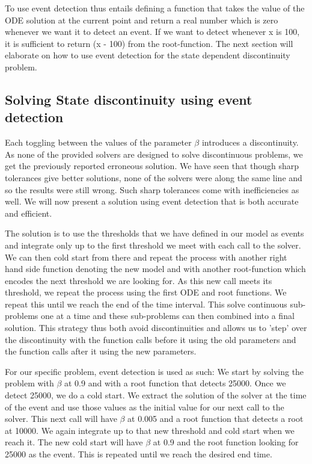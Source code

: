 To use event detection thus entails defining a function that takes the value of the ODE solution at the current point and return a real number which is zero whenever we want it to detect an event. If we want to detect whenever x is 100, it is sufficient to return (x - 100) from the root-function. The next section will elaborate on how to use event detection for the state dependent discontinuity problem.

\subsection{Solving State discontinuity using event detection}
\label{subsection:state_with_event_detection}
Each toggling between the values of the parameter $\beta$ introduces a discontinuity. As none of the provided solvers are designed to solve discontinuous problems, we get the previously reported erroneous solution. We have seen that though sharp tolerances give better solutions, none of the solvers were along the same line and so the results were still wrong. Such sharp tolerances come with inefficiencies as well. We will now present a solution using event detection that is both accurate and efficient.

The solution is to use the thresholds that we have defined in our model as events and integrate only up to the first threshold we meet with each call to the solver. We can then cold start from there and repeat the process with another right hand side function denoting the new model and with another root-function which encodes the next threshold we are looking for.  As this new call meets its threshold, we repeat the process using the first ODE and root functions. We repeat this until we reach the end of the time interval. This solve continuous sub-problems one at a time and these sub-problems can then combined into a final solution. This strategy thus both avoid discontinuities and allows us to 'step' over the discontinuity with the function calls before it using the old parameters and the function calls after it using the new parameters.

For our specific problem, event detection is used as such:
We start by solving the problem with $\beta$ at 0.9 and with a root function that detects 25000. Once we detect 25000, we do a cold start. We extract the solution of the solver at the time of the event and use those values as the initial value for our next call to the solver. This next call will have $\beta$ at 0.005 and a root function that detects a root at 10000. We again integrate up to that new threshold and cold start when we reach it. The new cold start will have $\beta$ at 0.9 and the root function looking for 25000 as the event. This is repeated until we reach the desired end time.


